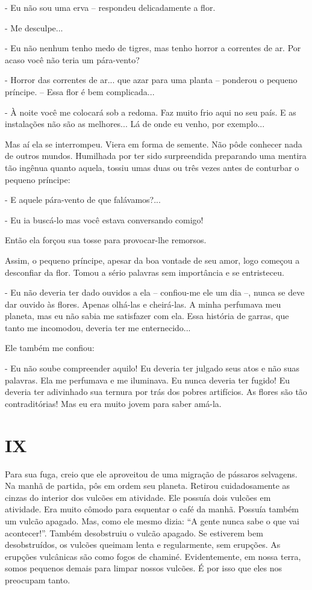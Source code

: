 - Eu não sou uma erva -- respondeu delicadamente a flor.

- Me desculpe...

- Eu não nenhum tenho medo de tigres, mas tenho horror a correntes de
ar. Por acaso você não teria um pára-vento?

- Horror das correntes de ar... que azar para uma planta -- ponderou o
pequeno príncipe. -- Essa flor é bem complicada...

- À noite você me colocará sob a redoma. Faz muito frio aqui no seu
país. E as instalações não são as melhores... Lá de onde eu venho, por
exemplo...

Mas aí ela se interrompeu. Viera em forma de semente. Não pôde conhecer
nada de outros mundos. Humilhada por ter sido surpreendida preparando
uma mentira tão ingênua quanto aquela, tossiu umas duas ou três vezes
antes de conturbar o pequeno príncipe:

- E aquele pára-vento de que falávamos?...

- Eu ia buscá-lo mas você estava conversando comigo!

Então ela forçou sua tosse para provocar-lhe remorsos.

Assim, o pequeno príncipe, apesar da boa vontade de seu amor, logo
começou a desconfiar da flor. Tomou a sério palavras sem importância e
se entristeceu.

- Eu não deveria ter dado ouvidos a ela -- confiou-me ele um dia --,
nunca se deve dar ouvido às flores. Apenas olhá-las e cheirá-las. A
minha perfumava meu planeta, mas eu não sabia me satisfazer com ela.
Essa história de garras, que tanto me incomodou, deveria ter me
enternecido...

Ele também me confiou:

- Eu não soube compreender aquilo! Eu deveria ter julgado seus atos e
não suas palavras. Ela me perfumava e me iluminava. Eu nunca deveria ter
fugido! Eu deveria ter adivinhado sua ternura por trás dos pobres
artifícios. As flores são tão contraditórias! Mas eu era muito jovem
para saber amá-la.

\chapter{IX}

Para sua fuga, creio que ele aproveitou de uma migração de pássaros
selvagens. Na manhã de partida, pôs em ordem seu planeta. Retirou
cuidadosamente as cinzas do interior dos vulcões em atividade. Ele
possuía dois vulcões em atividade. Era muito cômodo para esquentar o
café da manhã. Possuía também um vulcão apagado. Mas, como ele mesmo
dizia: ``A gente nunca sabe o que vai acontecer!''. Também desobstruiu o
vulcão apagado. Se estiverem bem desobstruídos, os vulcões queimam lenta
e regularmente, sem erupções. As erupções vulcânicas são como fogos de
chaminé. Evidentemente, em nossa terra, somos pequenos demais para
limpar nossos vulcões. É por isso que eles nos preocupam tanto.

